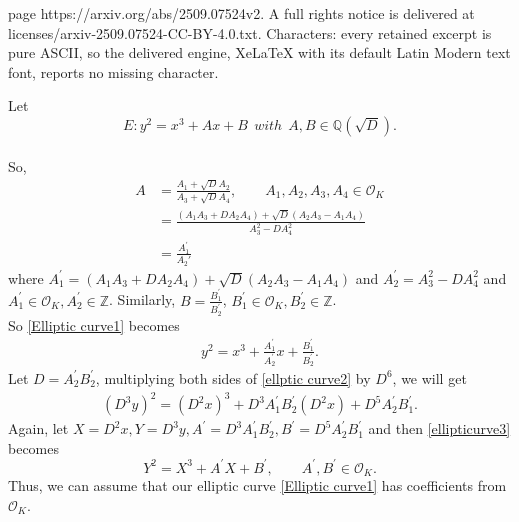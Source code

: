 \documentclass[10pt,a4paper]{amsart}
\begin{document}
page https://arxiv.org/abs/2509.07524v2. A full rights notice is delivered at licenses/arxiv-2509.07524-CC-BY-4.0.txt. Characters: every retained excerpt is pure ASCII, so the delivered engine, XeLaTeX with its default Latin Modern text font, reports no missing character.
 \begin{rmk}
     Let \begin{equation}\label{Elliptic curve1}
         E:y^2=x^3+Ax+B ~~with~~ A,B\in \mathbb Q(\sqrt{D}).
     \end{equation}\\ So,
     \begin{align*}
         A&=\frac{A_1+\sqrt{D}A_2}{A_3+\sqrt{D}A_4},\qquad A_1,A_2,A_3,A_4\in{\mathcal{O}_K}\\
         &=\frac{(A_1A_3+DA_2A_4)+\sqrt{D}(A_2A_3-A_1A_4)}{A_3^2-DA_4^2}\\
         &=\frac{A_1^{'}}{A_2{'}}
     \end{align*}
     where $A_1^{'}=(A_1A_3+DA_2A_4)+\sqrt{D}(A_2A_3-A_1A_4)$ and $A_2^{'}=A_3^2-DA_4^2$ and $A_1^{'}\in {\mathcal{O}}_K, A_{2}^{'}\in \mathbb Z$.
\smallskip
Similarly, $B=\frac{B_{1}^{'}}{B_{2}^{'}}$, $B_{1}^{'}\in{\mathcal{O}_K},B_{2}^{'}\in\mathbb Z$.\\
So \eqref{Elliptic curve1} becomes
\begin{align*}
    y^{2}=x^{3}+\frac{A_{1}^{'}}{A_{2}^{'}}x+\frac{B_{1}^{'}}{B_{2}^{'}}.
\end{align*}\label{ellptic curve2}
Let $D=A_{2}^{'}B_{2}^{'}$, multiplying both sides of \eqref{ellptic curve2} by $D^6$, we will get
\begin{align*}
    (D^3y)^2=(D^2x)^3+D^3A_{1}^{'}B_{2}^{'}(D^2x)+D^5A_{2}^{'}B_{1}^{'}.
\end{align*}\label{ellipticurve3}
Again, let $X=D^2x, Y=D^3y, A^{'}=D^3A_{1}^{'}B_{2}^{'}, B^{'}=D^5A_{2}^{'}B_{1}^{'}$ and then \eqref{ellipticurve3} becomes\\
\begin{equation}
    Y^{2}=X^3+A^{'}X+B^{'}, \qquad A^{'},B^{'}\in{\mathcal{O}_K}.
\end{equation}
Thus, we can assume that our elliptic curve \eqref{Elliptic curve1} has coefficients from $\mathcal{O}_K$.
 \end{rmk}
\end{document}
